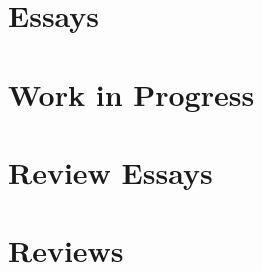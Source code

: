 \documentclass[
]{scrbook}
\begin{document}
\sloppy                         %




\tableofcontents{} 


\part{Essays}









\part{Work in Progress}




\part{Review Essays}

\part{Reviews}






\appendix


\end{document}

